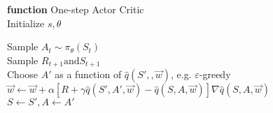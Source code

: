 \documentclass{standalone}
\begin{document}
\pagestyle{empty}
\begin{algorithm}[H]
  \textbf{function} One-step Actor Critic \\
  	Initialize $s, \theta$ \\

  	 {
  	Sample $A_t \sim \pi_\theta(S_t)$ \\
  	Sample $R_{t+1} \text{and} S_{t+1}$ \\
  	Choose $A'$ as a function of $\hat{q}(S', ,\vec{w})$, e.g. $\varepsilon$-greedy\\
  	$\vec{w} \leftarrow \vec{w} + \alpha [R + \gamma \hat{q}(S',A',\vec{w}) -\hat{q}(S,A,\vec{w})]\nabla\hat{q}(S,A,\vec{w})$\\
  	$S \leftarrow S', A \leftarrow A'$
  
}

\end{algorithm}
\end{document}
